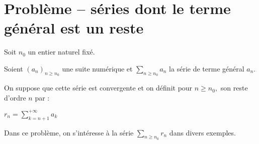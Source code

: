 \documentclass[twoside,french,11pt]{VcCours}
\begin{document}
  
\section*{Problème -- séries dont le terme général est un reste}
  Soit $n_0$ un entier naturel fixé.

  Soient $(a_n)_{n\geq n_0}$ une suite numérique et $\sum_{n \geq n_0} a_n$ la
  série de terme général $a_n.$ 
  
  \medskip
  
  On suppose que cette série est convergente et on définit pour $n\geq n_0,$ son reste
  d'ordre $n$ par :
  \begin{center}$r_n=\sum_{k=n+1}^{+\infty}a_k$
  \end{center}
  Dans ce problème, on s'intéresse à la
  série $\sum_{n \geq n_0} r_n$ dans divers exemples.
  
  \medskip
  
\end{document}
